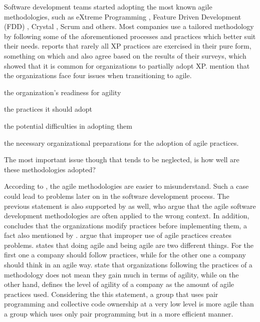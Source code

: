 Software development teams started adopting the most known agile methodologies, such as eXtreme Programming \cite{Beck:2004:EPE:1076267}, Feature Driven Development (FDD) \cite{Palmer:2001:PGF:600044}, Crystal \cite{Cockburn:2004:CCH:1406822}, Scrum \cite{scrum} and others. Most companies use a tailored methodology by following some of the aforementioned processes and practices which better suit their needs. \citet{williams2004toward} reports that rarely all XP practices are exercised in their pure form, something on which \citet{Reifer} and \citet{aveling} also agree based on the results of their surveys, which showed that it is common for organizations to partially adopt XP. \citet{sidky} mention that the organizations face four issues when transitioning to agile.
\begin{inparaenum} [a\upshape)]
\item the organization's readiness for agility
\item the practices it should adopt
\item the potential difficulties in adopting them
\item the necessary organizational preparations for the adoption of agile practices. 
\end{inparaenum}
The most important issue though that tends to be neglected, is how well are these methodologies adopted? 

According to \citet{6427226}, the agile methodologies are easier to misunderstand. Such a case could lead to problems later on in the software development process. The previous statement is also supported by \citet{cefam} as well, who argue that the agile software development methodologies are often applied to the wrong context. In addition, \citet{1629340} concludes that the organizations modify practices before implementing them, a fact also mentioned by \citet{1579312}. \citet{hossain} argue that improper use of agile practices creates problems. \citet{sahota} states that doing agile and being agile are two different things. For the first one a company should follow practices, while for the other one a company should think in an agile way. \citet{lappoA04} state that organizations following the practices of a methodology does not mean they gain much in terms of agility, while on the other hand, \citet{sidky_dissertation} defines the level of agility of a company as the amount of agile practices used. Considering the this statement, a group that uses pair programming and collective code ownership at a very low level is more agile than a group which uses only pair programming but in a more efficient manner.

